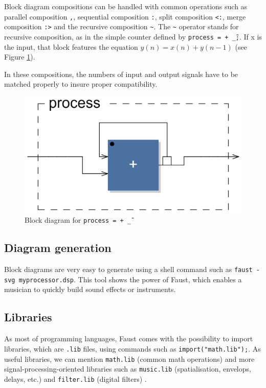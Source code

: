 \documentclass[11pt,a4paper]{article}
\begin{document}
Block diagram compositions can be handled with common operations such as parallel composition \texttt{,}, sequential composition \texttt{:}, split composition \texttt{<:}, merge composition \texttt{:>} and the recursive composition \texttt{\~}. The \texttt{\~} operator stands for recursive composition, as in the simple counter defined by \texttt{process = + \~ \_;}. If x is the input, that block features the equation $y(n) = x(n) + y(n-1)$ (see Figure \ref{fig:recursive}).

In these compositions, the numbers of input and output signals have to be matched properly to insure proper compatibility.
\begin{figure}[h]
	\centering
	\includegraphics[scale=0.2]{pictures/recursive.png}
	\caption{Block diagram for \texttt{process = + \~ \_}}
	\label{fig:recursive}
\end{figure}

\subsection*{Diagram generation}
Block diagrams are very easy to generate using a shell command such as \texttt{faust -svg myprocessor.dsp}. This tool shows the power of Faust, which enables a musician to quickly build sound effects or instruments.

\subsection*{Libraries}
As most of programming languages, Faust comes with the possibility to import libraries, which are \texttt{.lib} files, using commands such as \texttt{import("math.lib");}. As useful libraries, we can mention \texttt{math.lib} (common math operations) and more signal-processing-oriented libraries such as \texttt{music.lib} (spatialisation, envelops, delays, etc.) and \texttt{filter.lib} (digital filters) \cite{filters}.
\end{document}

